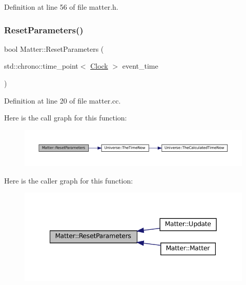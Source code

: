Definition at line 56 of file matter.\+h.

\mbox{\label{class_matter_adfd93d323e43d09fa8d8b7cdd2258611}} 
\subsubsection{\texorpdfstring{Reset\+Parameters()}{ResetParameters()}}
{\footnotesize\ttfamily bool Matter\+::\+Reset\+Parameters (\begin{DoxyParamCaption}\item[{std\+::chrono\+::time\+\_\+point$<$ \mbox{\hyperlink{universe_8h_a0ef8d951d1ca5ab3cfaf7ab4c7a6fd80}{Clock}} $>$}]{event\+\_\+time }\end{DoxyParamCaption})}



Definition at line 20 of file matter.\+cc.

Here is the call graph for this function\+:\nopagebreak
\begin{figure}[H]
\begin{center}
\leavevmode
\includegraphics[width=350pt]{class_matter_adfd93d323e43d09fa8d8b7cdd2258611_cgraph}
\end{center}
\end{figure}
Here is the caller graph for this function\+:\nopagebreak
\begin{figure}[H]
\begin{center}
\leavevmode
\includegraphics[width=342pt]{class_matter_adfd93d323e43d09fa8d8b7cdd2258611_icgraph}
\end{center}
\end{figure}
\mbox{\label{class_matter_a514b4a64589eb3fbc3db6b3b356bd687}} 
